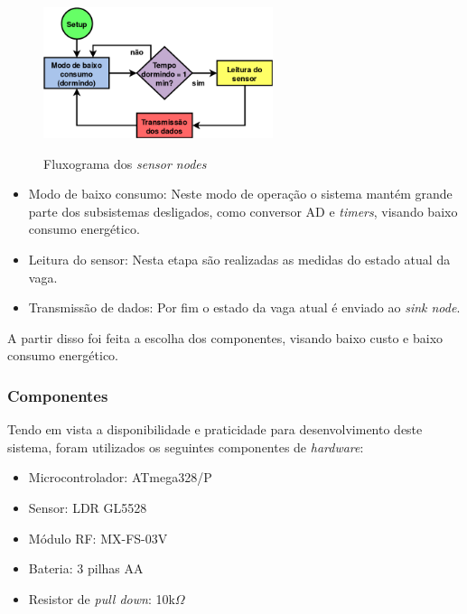 \documentclass[oneside,openright,12pt]{ufsm_2015} %
\begin{document}
    \begin{figure}[ht]
     	    \caption{\label{exepretex} Fluxograma dos \textit{sensor nodes}}
            \centering
            \includegraphics[width=0.6\textwidth]{figuras/funcionamento-sensor-node.png}
            \vspace{\baselineskip} %
                \label{fig:flux-sensor-node}
    \end{figure}
    
    \begin{itemize}
        \item Modo de baixo consumo: Neste modo de operação o sistema mantém grande parte dos subsistemas desligados, como conversor AD e \textit{timers}, visando baixo consumo energético.
        \item Leitura do sensor: Nesta etapa são realizadas as medidas do estado atual da vaga.
        \item Transmissão de dados: Por fim o estado da vaga atual é enviado ao \textit{sink node}.
        
    \end{itemize}
    
    A partir disso foi feita a escolha dos componentes, visando baixo custo e baixo consumo energético.
    
    \subsubsection{Componentes}
    Tendo em vista a disponibilidade e praticidade para desenvolvimento deste sistema, foram utilizados os seguintes componentes de \textit{hardware}:
    \begin{itemize}
        \item Microcontrolador: ATmega328/P
        \item Sensor: LDR GL5528 
        \item Módulo RF: MX-FS-03V
        \item Bateria: 3 pilhas AA
        \item Resistor de \textit{pull down}: 10k$\Omega$
    \end{itemize}
    
\end{document}
